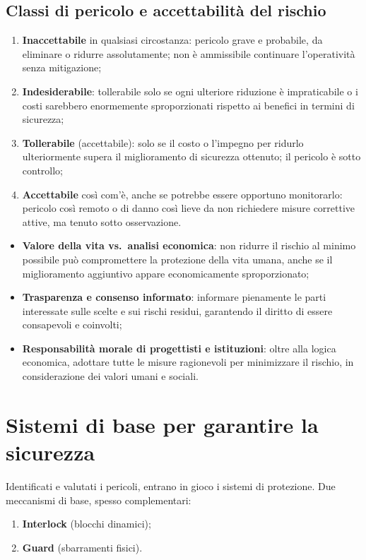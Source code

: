 \subsection{Classi di pericolo e accettabilità del rischio}
\begin{enumerate}
    \item[\textbf{I.}] \textbf{Inaccettabile} in qualsiasi circostanza: pericolo grave e probabile, da eliminare o ridurre assolutamente; non è ammissibile continuare l'operatività senza mitigazione;
    \item[\textbf{II.}] \textbf{Indesiderabile}: tollerabile solo se ogni ulteriore riduzione è impraticabile o i costi sarebbero enormemente sproporzionati rispetto ai benefici in termini di sicurezza;
    \item[\textbf{III.}] \textbf{Tollerabile} (accettabile): solo se il costo o l'impegno per ridurlo ulteriormente supera il miglioramento di sicurezza ottenuto; il pericolo è sotto controllo;
    \item[\textbf{IV.}] \textbf{Accettabile} così com'è, anche se potrebbe essere opportuno monitorarlo: pericolo così remoto o di danno così lieve da non richiedere misure correttive attive, ma tenuto sotto osservazione.
\end{enumerate}

\begin{note}
\begin{itemize}
    \item \textbf{Valore della vita vs.\ analisi economica}: non ridurre il rischio al minimo possibile può compromettere la protezione della vita umana, anche se il miglioramento aggiuntivo appare economicamente sproporzionato;
    \item \textbf{Trasparenza e consenso informato}: informare pienamente le parti interessate sulle scelte e sui rischi residui, garantendo il diritto di essere consapevoli e coinvolti;
    \item \textbf{Responsabilità morale di progettisti e istituzioni}: oltre alla logica economica, adottare tutte le misure ragionevoli per minimizzare il rischio, in considerazione dei valori umani e sociali.
\end{itemize}
\end{note}

\section{Sistemi di base per garantire la sicurezza}
Identificati e valutati i pericoli, entrano in gioco i sistemi di protezione. Due meccanismi di base, spesso complementari:
\begin{enumerate}
    \item \textbf{Interlock} (blocchi dinamici);
    \item \textbf{Guard} (sbarramenti fisici).
\end{enumerate}

